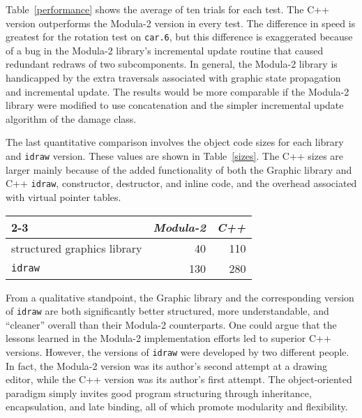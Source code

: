 Table~\ref{performance} shows the average of ten trials for each test.  The
C++ version outperforms the \mbox{Modula-2} version in every test.  The
difference in speed is greatest for the rotation test on {\tt car.6}, but
this difference is exaggerated because of
a bug in the \mbox{Modula-2} library's incremental update
routine that caused redundant redraws of two subcomponents.  In general, the
\mbox{Modula-2} library is handicapped by the extra traversals associated
with graphic state propagation and incremental update.  The results would be
more comparable if the \mbox{Modula-2} library were modified to use
concatenation and the simpler incremental update algorithm of the damage
class.

The last quantitative comparison involves the object code sizes for each
library and {\tt idraw} version.  These values are shown in
Table~\ref{sizes}.  The C++ sizes are larger mainly because of the added
functionality of both the Graphic library and C++ {\tt idraw},
constructor, destructor, and inline code, and the overhead associated with
virtual pointer tables.

\begin{table*}[t]
\begin{center}
\begin{tabular}{|l|r|r|} \cline{2-3}
    \multicolumn{1}{c|}{}
	& \multicolumn{1}{|c|}{{\em Modula-2}} & \multicolumn{1}{c|}{{\em C++}}
	\\ \hline
    structured graphics library & 40 & 110
	\\
    {\tt idraw} & 130 & 280
	\\ \hline
\end{tabular}
\caption{
    Comparison of \mbox{Modula-2} and C++ object code sizes (in kilobytes)
}
\label{sizes}
\end{center}
\end{table*}

From a qualitative standpoint, the Graphic library and the corresponding
version of {\tt idraw} are both significantly better structured, more
understandable, and ``cleaner'' overall than their \mbox{Modula-2}
counterparts.  One could argue that the lessons learned in the
\mbox{Modula-2} implementation efforts led to superior C++ versions.
However, the versions of {\tt idraw} were developed by two different people.
In fact, the \mbox{Modula-2} version was its author's second attempt at a
drawing editor, while the C++ version was its author's first attempt.  The
object-oriented paradigm simply invites good program structuring through
inheritance, encapsulation, and late binding, all of which promote
modularity and flexibility.

